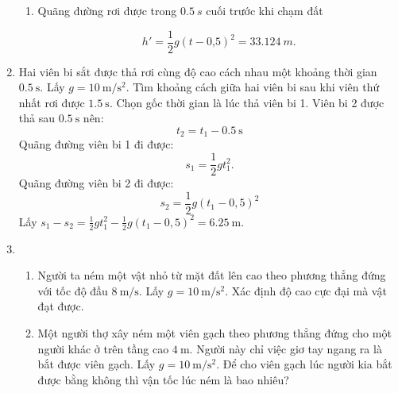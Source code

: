 \begin{enumerate}[label=\bfseries Bài \arabic*:,leftmargin=1.5cm]
{\begin{enumerate}[label=\alph*)]
			$$h = \dfrac{1}{2}gt^2 = \SI{47,089}{m}.$$
			
			Vận tốc lúc chạm đất
			
			$$ v = gt = \SI{30,38}{m/s}.$$
			
			\item Quãng đường rơi được trong $\SI{0,5}{s}$ cuối trước khi chạm đất
			
			$$h' = \dfrac{1}{2} g(t - \text{0,5})^2 = \SI{33,124}{m}.$$
		\end{enumerate}
	}
	
	\item {}
	
	
	{
		Hai viên bi sắt được thả rơi cùng độ cao cách nhau một khoảng thời gian $\SI{0,5}{\second}$. Lấy $g = \SI{10}{\meter/\second^2}$. Tìm khoảng cách giữa hai viên bi sau khi viên thứ nhất rơi được $\SI{1,5}{\second}$.
	}
	\hideall
	{	
		Chọn gốc thời gian là lúc thả viên bi 1. Viên bi 2 được thả sau $\SI{0,5}{\second}$ nên:
		$$t_2=t_1-\SI{0,5}{\second}$$
		Quãng đường viên bi 1 đi được:
		$$s_1=\frac{1}{2}gt_1^2.$$
		Quãng đường viên bi 2 đi được:
		$$s_2=\frac{1}{2}g(t_1-0,5)^2$$
		Lấy $s_1-s_2=\frac{1}{2}gt_1^2-\frac{1}{2}g(t_1-0,5)^2=\SI{6,25}{\meter}$.
	}

\item{}\\
\begin{enumerate}[label=\alph*)]
	\item Người ta ném một vật nhỏ từ mặt đất lên cao theo phương thẳng đứng với tốc độ đầu $\SI{8}{\meter/\second}$. Lấy $g=\SI{10}{\meter/\second^2}$. Xác định độ cao cực đại mà vật đạt được.
	\item Một người thợ xây ném một viên gạch theo phương thẳng đứng cho một người khác ở trên tầng cao $\SI{4}{\meter}$. Người này chỉ việc giơ tay ngang ra là bắt được viên gạch. Lấy $g=\SI{10}{\meter/\second^2}$. Để cho viên gạch lúc người kia bắt được bằng không thì vận tốc lúc ném là bao nhiêu?
\end{enumerate}
	

\end{enumerate}
